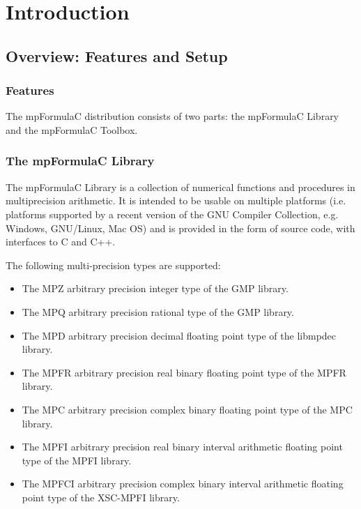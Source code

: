 \chapter{Introduction}
\label{Introduction1} 



\section{Overview: Features and Setup}


\subsection{Features}
The mpFormulaC distribution consists of two parts: the mpFormulaC Library and the mpFormulaC Toolbox.

\subsection{The mpFormulaC Library}

The mpFormulaC Library is a collection of numerical functions and procedures in multiprecision arithmetic. It is intended to be usable on multiple platforms (i.e. platforms supported by a recent version of the GNU Compiler Collection, e.g. Windows, GNU/Linux, Mac OS) and is provided in the form of source code, with interfaces to C and C++. 

The following multi-precision types are supported:

\begin{itemize}		
  \item The MPZ arbitrary precision integer type of the GMP library. 
  \item The MPQ arbitrary precision rational type of the GMP library. 
  \item The MPD arbitrary precision decimal floating point type of the libmpdec library. 
  \item The MPFR arbitrary precision real binary floating point type of the MPFR library.
  \item The MPC arbitrary precision complex binary floating point type of the MPC library.
  \item The MPFI arbitrary precision real binary interval arithmetic floating point type of the MPFI library.
  \item The MPFCI arbitrary precision complex binary interval arithmetic floating point type of the XSC-MPFI library.   
\end{itemize}

